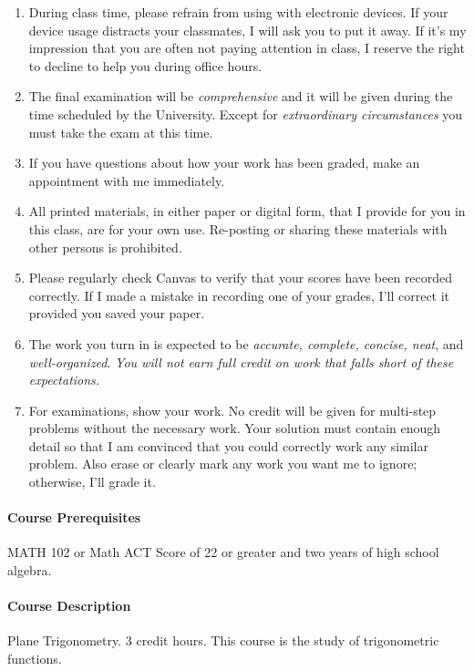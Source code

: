 \documentclass[12pt]{article}
\newcounter{ex}\setcounter{ex}{0}
\begin{document}
\begin{enumerate}
\item During class time, please refrain from using with electronic devices. If your 
device usage distracts your classmates, I will ask you to put it away. If it's my 
impression that you are often not paying attention in class, I reserve the right to 
decline to help you during office hours.

\item The final examination will be \emph{comprehensive} and it will be given during the 
time scheduled by the University. Except for \emph{extraordinary circumstances}
you must take the exam at this time.


 
\item If you have questions about how your work has been graded, make an appointment with me immediately.

\item All printed materials, in either paper or digital form, that I 
provide for you in this class, are for your own use. Re-posting or 
sharing these materials with other persons is prohibited. 

\item Please regularly check Canvas  to verify that your scores have 
been recorded correctly.  If I made a mistake in recording one of
your grades, I'll correct it provided you saved your paper.

\item The work you turn in is expected to be \emph{accurate, 
complete, concise, neat}, and \emph{well-organized}.  
\emph{You will not earn full credit on work that falls short of 
these expectations.}

\item For examinations, show your work.  No credit will be given for multi-step problems without the necessary work. Your solution must contain enough detail
so that I am convinced that you could correctly work any similar problem. Also erase or clearly mark any work you want me to ignore; otherwise,
I'll grade it.  

\end{enumerate}

\paragraph{Course Prerequisites} MATH 102 or Math ACT Score of 22 or greater and two years of high school algebra.

\paragraph{Course Description}  Plane Trigonometry.  3 credit hours. This course is the study of trigonometric functions.
\end{document}
